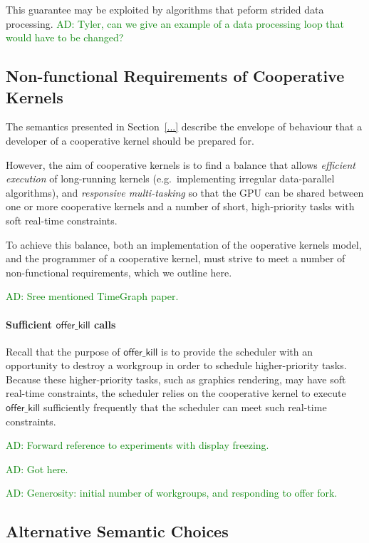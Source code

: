 \documentclass[nocopyrightspace]{sigplanconf-pldi16}
\newcommand{\ADComment}[1]{\textcolor{green}{AD: #1}}
\newcommand{\offerkill}{\mathsf{offer\_kill}}
\begin{document}
This guarantee may be exploited by algorithms that peform strided data
processing.  \ADComment{Tyler, can we give an example of a data
  processing loop that would have to be changed?}


\subsection{Non-functional Requirements of Cooperative Kernels}

The semantics presented in Section~\ref{...} describe the envelope of
behaviour that a developer of a cooperative kernel should be prepared
for.

However, the aim of cooperative kernels is to find a balance that
allows \emph{efficient execution} of long-running kernels
(e.g.\ implementing irregular data-parallel algorithms), and
\emph{responsive multi-tasking} so that the GPU can be shared between
one or more cooperative kernels and a number of short, high-priority
tasks with soft real-time constraints.

To achieve this balance, both an implementation of the ooperative
kernels model, and the programmer of a cooperative kernel, must strive
to meet a number of non-functional requirements, which we outline
here.

\ADComment{Sree mentioned TimeGraph paper.}

\paragraph{Sufficient $\offerkill$ calls}

Recall that the purpose of $\offerkill$ is to provide the scheduler
with an opportunity to destroy a workgroup in order to schedule
higher-priority tasks.  Because these higher-priority tasks, such as
graphics rendering, may have soft real-time constraints, the scheduler
relies on the cooperative kernel to execute $\offerkill$ sufficiently
frequently that the scheduler can meet such real-time constraints.

\ADComment{Forward reference to experiments with display freezing.}

\ADComment{Got here.}

\ADComment{Generosity: initial number of workgroups, and responding to offer fork.}

\subsection{Alternative Semantic Choices}
\end{document}
